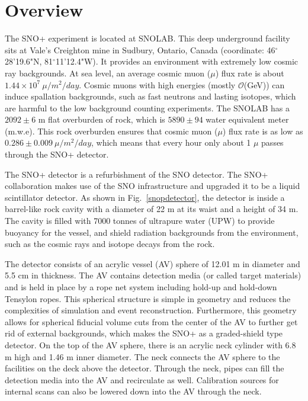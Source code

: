 
\section{Overview}\label{sect:overview}
The SNO+ experiment is located at SNOLAB. This deep underground facility sits at Vale's Creighton mine in Sudbury, Ontario, Canada (coordinate: 46$^\circ$28'19.6"N, 81$^\circ$11'12.4"W). It provides an environment with extremely low cosmic ray backgrounds. At sea level, an average cosmic muon ($\mu$) flux rate is about $1.44\times 10^7~\mu/m^2/day$\cite{muonflux}. Cosmic muons with high energies (mostly $\mathcal{O}$(GeV)) can induce spallation backgrounds, such as fast neutrons and lasting isotopes, which are harmful to the low background counting experiments\cite{beacom2017physics}. The SNOLAB has a $2092\pm6$ m flat overburden of rock, which is $5890\pm94$ water equivalent meter (m.w.e). This rock overburden ensures that cosmic muon ($\mu$) flux rate is as low as $0.286\pm0.009~\mu/m^2/day$\cite{snop_jinst}, which means that every hour only about 1 $\mu$ passes through the SNO+ detector. 

The SNO+ detector is a refurbishment of the SNO detector. The SNO+ collaboration makes use of the SNO infrastructure and upgraded it to be a liquid scintillator detector. As shown in Fig.~\ref{snopdetector}, the detector is inside a barrel-like rock cavity with a diameter of 22 m at its waist and a height of 34 m. The cavity is filled with 7000 tonnes of ultrapure water (UPW) to provide buoyancy for the vessel, and shield radiation backgrounds from the environment, such as the cosmic rays and isotope decays from the rock. 

The detector consists of an acrylic vessel (AV) sphere of 12.01 m in diameter and 5.5 cm in thickness. The AV contains detection media (or called target materials) and is held in place by a rope net system including hold-up and hold-down Tensylon ropes. This spherical structure is simple in geometry and reduces the complexities of simulation and event reconstruction. Furthermore, this geometry allows for spherical fiducial volume cuts from the center of the AV to further get rid of external backgrounds, which makes the SNO+ as a graded-shield type detector\cite{waterfield2017optical}.
On the top of the AV sphere, there is an acrylic neck cylinder with 6.8 m high and 1.46 m inner diameter. The neck connects the AV sphere to the facilities on the deck above the detector. Through the neck, pipes can fill the detection media into the AV and recirculate as well. Calibration sources for internal scans can also be lowered down into the AV through the neck.

